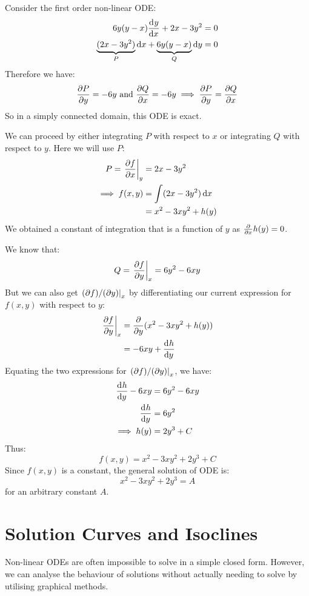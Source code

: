 \documentclass[../main.tex]{subfiles}
\begin{document}
\begin{example}
  Consider the first order non-linear ODE:
  \begin{align*}
    6y(y-x)\deriv{y}{x} + 2x - 3y^2 &= 0 \\
    \underbrace{(2x - 3y^2)}_{P}\d{x} + \underbrace{6y(y - x)}_{Q}\d{y} &= 0
  \end{align*}
  Therefore we have:
  \[
    \pderiv{P}{y} = -6y \text{ and } \pderiv{Q}{x} = -6y \implies \pderiv{P}{y} = \pderiv{Q}{x}
  \]
  So in a simply connected domain, this ODE is exact.

  We can proceed by either integrating $P$ with respect to $x$ or integrating $Q$ with respect to $y$.
  Here we will use $P$:
  \begin{align*}
    P = \at{\pderiv{f}{x}}{y} &= 2x - 3y^2 \\
    \implies f(x, y) &= \int  (2x - 3y^2) \d{x} \\
                     &= x^2 - 3xy^2 + h(y)
  \end{align*}
  We obtained a constant of integration that is a function of $y$ as $\pderiv{}{x}h(y) = 0$.

  We know that:
  \[
    Q = \at{\pderiv{f}{y}}{x} = 6y^2 - 6xy
  \]
  But we can also get $\left. (\partial f)/(\partial y) \right|_{x}$ by differentiating our current expression for $f(x, y)$ with respect to $y$:
  \begin{align*}
    \at{\pderiv{f}{y}}{x} &= \pderiv{}{y}(x^2 - 3xy^2 + h(y)) \\
                          &= -6xy + \deriv{h}{y}
  \end{align*}
  Equating the two expressions for $\left. (\partial f)/(\partial y) \right|_{x}$, we have:
  \begin{align*}
    \deriv{h}{y} - 6xy &= 6y^2 - 6xy \\
    \deriv{h}{y} &= 6y^2 \\
    \implies h(y) &= 2y^3 + C
  \end{align*}
  Thus:
  \[
    f(x, y) = x^2 - 3xy^2 + 2y^3 + C
  \]
  Since $f(x, y)$ is a constant, the general solution of ODE is:
  \[
    x^2 - 3xy^2 + 2y^3 = A
  \]
  for an arbitrary constant $A$.
\end{example}
\section{Solution Curves and Isoclines}
Non-linear ODEs are often impossible to solve in a simple closed form.
However, we can analyse the behaviour of solutions without actually needing to solve by utilising graphical methods.
\end{document}
